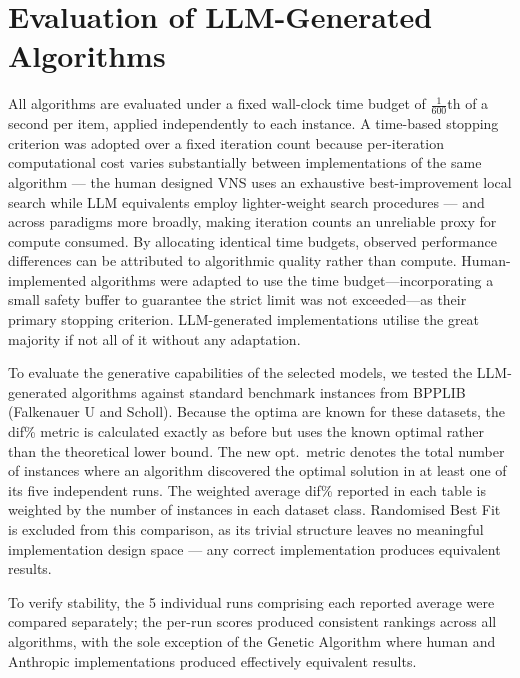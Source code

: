 \documentclass[11pt]{article}
\begin{document}
\section{Evaluation of LLM-Generated Algorithms \label{sec:llm-eval}}
All algorithms are evaluated under a fixed wall-clock time budget of 
$\frac{1}{600}$th of a second per item, applied independently to each instance. 
A time-based stopping criterion was adopted over a fixed iteration count because 
per-iteration computational cost varies substantially between implementations of 
the same algorithm --- the human designed VNS uses an exhaustive best-improvement local 
search while LLM equivalents employ lighter-weight search procedures --- and 
across paradigms more broadly, making iteration counts an unreliable proxy for 
compute consumed. By allocating identical time budgets, observed performance 
differences can be attributed to algorithmic quality rather than compute. 
Human-implemented algorithms were adapted to use the time budget---incorporating 
a small safety buffer to guarantee the strict limit was not exceeded---as their 
primary stopping criterion. LLM-generated implementations utilise the great 
majority if not all of it without any adaptation.

To evaluate the generative capabilities of the selected models, we tested the 
LLM-generated algorithms against standard benchmark instances from BPPLIB 
(Falkenauer U and Scholl). Because the optima are known for these datasets, the 
dif\% metric is calculated exactly as before but uses the known optimal rather 
than the theoretical lower bound. The new opt.\ metric denotes the total number of instances where an algorithm 
discovered the optimal solution in at least one of its five independent runs. 
The weighted average dif\% reported in each table is weighted by the number 
of instances in each dataset class. Randomised Best Fit is excluded from this 
comparison, as its trivial structure leaves no meaningful implementation design 
space --- any correct implementation produces equivalent results.

To verify stability, the 5 individual runs comprising each reported average were compared separately; the per-run scores produced consistent rankings across all algorithms, with the sole exception of the Genetic Algorithm where human and Anthropic implementations produced effectively equivalent results.
\end{document}
